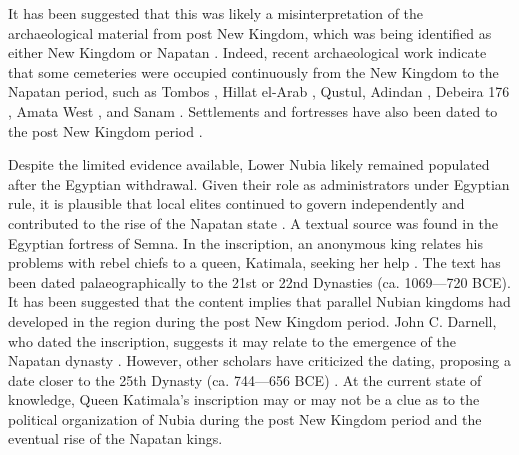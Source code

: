 It has been suggested that this was likely a misinterpretation of the archaeological material from post New Kingdom, which was being identified as either New Kingdom or Napatan \parencites[p.~109-110]{torokKingdomKushHandbook1997}[p.~37]{williamsExcavationsAbuSimbel1990}[p.~415]{williamsNapatanNeoKushiteState2020}. Indeed, recent archaeological work indicate that some cemeteries were occupied continuously from the New Kingdom to the Napatan period, such as Tombos \parencites{buzonEntanglementFormationAncient2016}[p.~7]{smithEthnicityCulture2007}, Hillat el-Arab \parencite{vincentelliHillatElArabJoint2006}, Qustul, Adindan \parencite[p.141]{williamsExcavationsAbuSimbel1992}, Debeira 176 \parencite[p.~200-205]{save-soderberghScandinavianJointExpedition1989}, Amata West \parencites[p.~57]{spencerCemeteriesLateRamesside2009}{binderCemeteryAmaraWest2011}{binder10th9thCenturyBC2011}, and Sanam \parencite{lohwasserAspekteNapatanischenGesellschaft2012}. Settlements and fortresses have also been dated to the post New Kingdom period \parencites[p.~1071-1078]{jesseFendingDesertDwellers2019}[p.~416-417]{williamsNapatanNeoKushiteState2020}.

Despite the limited evidence available, Lower Nubia likely remained populated after the Egyptian withdrawal. Given their role as administrators under Egyptian rule, it is plausible that local elites continued to govern independently and contributed to the rise of the Napatan state \parencites[p.~116]{edwardsNubianArchaeologySudan2004}[p.~111]{torokKingdomKushHandbook1997}. A textual source was found in the Egyptian fortress of Semna. In the inscription, an anonymous king relates his problems with rebel chiefs to a queen, Katimala, seeking her help \parencites{darnellInscriptionQueenKatimala2006}[p.~296]{torokTwoWorldsFrontier2009}. The text has been dated palaeographically to the 21st or 22nd Dynasties (ca. 1069—720 BCE). It has been suggested that the content implies that parallel Nubian kingdoms had developed in the region during the post New Kingdom period. John C. Darnell, who dated the inscription, suggests it may relate to the emergence of the Napatan dynasty \parencite[p.~60]{darnellInscriptionQueenKatimala2006}. However, other scholars have criticized the dating, proposing a date closer to the 25th Dynasty (ca. 744—656 BCE) \parencite[p.~298]{torokTwoWorldsFrontier2009}. At the current state of knowledge, Queen Katimala’s inscription may or may not be a clue as to the political organization of Nubia during the post New Kingdom period and the eventual rise of the Napatan kings.

